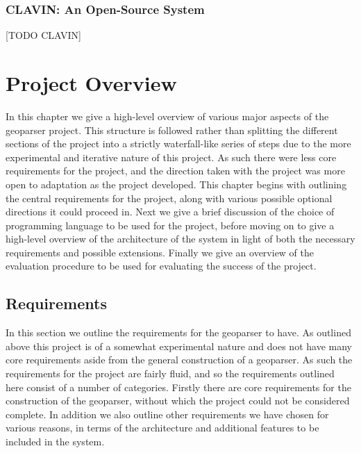 \documentclass[12pt, a4paper]{report}
\begin{document}

\subsection{CLAVIN: An Open-Source System}

[TODO CLAVIN]

\chapter{Project Overview}

In this chapter we give a high-level overview of various major aspects of the geoparser project. This structure is followed rather than splitting the different sections of the project into a strictly waterfall-like series of steps due to the more experimental and iterative nature of this project. As such there were less core requirements for the project, and the direction taken with the project was more open to adaptation as the project developed. This chapter begins with outlining the central requirements for the project, along with various possible optional directions it could proceed in. Next we give a brief discussion of the choice of programming language to be used for the project, before moving on to give a high-level overview of the architecture of the system in light of both the necessary requirements and possible extensions. Finally we give an overview of the evaluation procedure to be used for evaluating the success of the project.

\section{Requirements}

In this section we outline the requirements for the geoparser to have. As outlined above this project is of a somewhat experimental nature and does not have many core requirements aside from the general construction of a geoparser. As such the requirements for the project are fairly fluid, and so the requirements outlined here consist of a number of categories. Firstly there are core requirements for the construction of the geoparser, without which the project could not be considered complete. In addition we also outline other requirements we have chosen for various reasons, in terms of the architecture and additional features to be included in the system.
\end{document}
